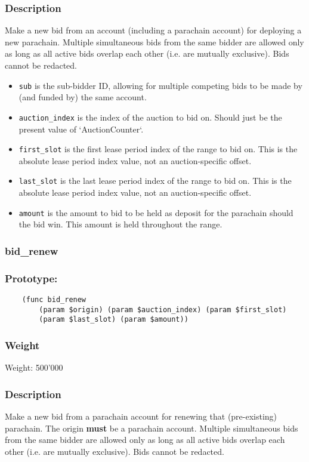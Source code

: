 \documentclass[11pt,a4paper]{article}
\begin{document}
\subsubsection*{Description}
Make a new bid from an account (including a parachain account) for deploying a new parachain. Multiple simultaneous bids from the same bidder are allowed only as long as all active bids overlap each other (i.e. are mutually exclusive). Bids cannot be redacted.

\begin{itemize}
\item \verb|sub| is the sub-bidder ID, allowing for multiple competing bids to be made by (and funded by) the same account.
\item \verb|auction_index| is the index of the auction to bid on. Should just be the present value of `AuctionCounter`.
\item \verb|first_slot| is the first lease period index of the range to bid on. This is the absolute lease period index value, not an auction-specific offset.
\item \verb|last_slot| is the last lease period index of the range to bid on. This is the absolute lease period index value, not an auction-specific offset.
\item \verb|amount| is the amount to bid to be held as deposit for the parachain should the bid win. This amount is held throughout the range.
\end{itemize}

\subsubsection{bid\_renew}
\subsubsection*{Prototype:}
\begin{verbatim}
    (func bid_renew
        (param $origin) (param $auction_index) (param $first_slot)
        (param $last_slot) (param $amount))
\end{verbatim}
\subsubsection*{Weight}
Weight: 500'000
\subsubsection*{Description}
Make a new bid from a parachain account for renewing that (pre-existing) parachain. The origin \textbf{must} be a parachain account. Multiple simultaneous bids from the same bidder are allowed only as long as all active bids overlap each other (i.e. are mutually exclusive). Bids cannot be redacted.
\end{document}
